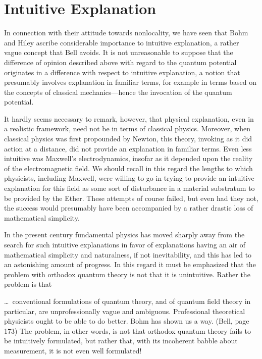 \section*{Intuitive Explanation}

In connection with their attitude towards nonlocality, we have seen that
Bohm and Hiley ascribe considerable importance to intuitive explanation, a
rather vague concept that Bell avoids. It is not unreasonable to suppose
that the difference of opinion described above with regard to the quantum
potential originates in a difference with respect to intuitive
explanation, a notion that presumably involves explanation in familiar
terms, for example in terms based on the concepts of classical
mechanics---hence the invocation of the quantum potential.

It hardly seems necessary to remark, however, that physical explanation,
even in a realistic framework, need not be in terms of classical physics.
Moreover, when classical physics was first propounded by Newton, this
theory, invoking as it did action at a distance, did not provide an
explanation in familiar terms. Even less intuitive was Maxwell's
electrodynamics, insofar as it depended upon the reality of the
electromagnetic field. We should recall in this regard the lengths to which
physicists, including Maxwell, were willing to go in trying to provide an
intuitive explanation for this field as some sort of disturbance in a
material substratum to be provided by the Ether. These attempts of course
failed, but even had they not, the success would presumably have been
accompanied by a rather drastic loss of mathematical simplicity.

In the present century fundamental physics has moved sharply away from the
search for such intuitive explanations in favor of explanations having an
air of mathematical simplicity and naturalness, if not inevitability, and
this has led to an astonishing amount of progress. In this regard it must
be emphasized that the problem with orthodox quantum theory is not that it
is unintuitive. Rather the problem is that

\bq \noindent \dots\  conventional formulations of quantum theory, and of
quantum field theory in particular, are unprofessionally vague and
ambiguous. Professional theoretical physicists ought to be able to do
better. Bohm has shown us a way. (Bell, page 173)
\eq
The problem, in other words, is not that orthodox quantum theory fails to be
intuitively formulated, but rather that, with its incoherent babble about
measurement,  it  is not even  well formulated!

